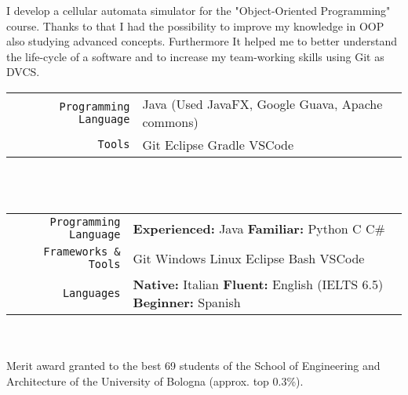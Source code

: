 \documentclass[
    10pt,
    A4,
    english,
    draft = false,
    twoside = false
]{article}
\begin{document}
	{I develop a cellular automata simulator for the "Object-Oriented Programming" course. Thanks to that I had the possibility to improve my knowledge in OOP also studying advanced concepts. Furthermore It helped me to better understand the life-cycle of a software and to increase my team-working skills using Git as DVCS.} 
	\tab \begin{tabular}{r p{}}
		\texttt{\large Programming Language} &  Java (Used JavaFX, Google Guava, Apache commons) \\
		\texttt{\large Tools} & Git \cvContactSep Eclipse \cvContactSep Gradle \cvContactSep VSCode \\
	\end{tabular}\\~\\
	
	\tab \begin{tabular}{r p{}}
		\texttt{\large Programming Language} & \textbf{Experienced:} Java  \tab \textbf{Familiar:} Python \cvContactSep C \cvContactSep C\# \\
		\texttt{\large Frameworks \& Tools} & Git \cvContactSep Windows \cvContactSep Linux \cvContactSep Eclipse \cvContactSep Bash \cvContactSep VSCode \\
		\texttt{\large Languages} & \textbf{Native:} Italian \cvContactSep \textbf{Fluent:} English (IELTS 6.5) \cvContactSep \textbf{Beginner:} Spanish \\
	\end{tabular}\\~\\
	{Merit award granted to the best 69 students of the School of Engineering and Architecture of the University of Bologna (approx. top 0.3\%).}
\end{document}
